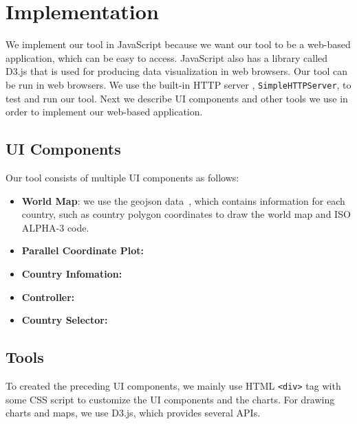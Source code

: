 \section{Implementation}
We implement our tool in JavaScript because we want our tool to be a web-based application, which can be easy to access. JavaScript also has a library called D3.js that is used for producing data visualization in web browsers. Our tool can be run in web browsers. We use the built-in HTTP server , \texttt{SimpleHTTPServer}, to test and run our tool. Next we describe UI components and other tools we use in order to implement our web-based application.
\subsection{UI Components}
Our tool consists of multiple UI components as follows:
\begin{itemize}
	\item \textbf{World Map}: we use the geojson data~\cite{geocountries}, which contains information for each country, such as country polygon coordinates to draw the world map and ISO ALPHA-3 code.
	\item \textbf{Parallel Coordinate Plot:}
    \item \textbf{Country Infomation:}
	\item \textbf{Controller:}
    \item \textbf{Country Selector:}
\end{itemize}

\subsection{Tools}
To created the preceding UI components, we mainly use HTML \texttt{<div>} tag with some CSS script to customize the UI components and the charts. For drawing charts and maps, we use D3.js, which provides several APIs.
